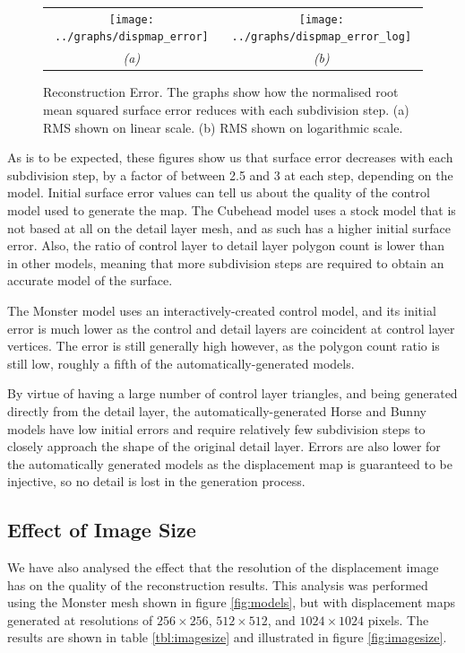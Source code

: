 \begin{figure}
\begin{center}
\begin{tabular}{cc} 
\texttt{[image: ../graphs/dispmap\_error]} & 
\texttt{[image: ../graphs/dispmap\_error\_log]} \\
{\it(a)} & {\it(b)}
\end{tabular}
\caption[Reconstruction Error]{\label{fig:reconerror} Reconstruction Error. The graphs show how the normalised root mean squared surface error reduces with each subdivision step. (a) RMS shown on linear scale. (b) RMS shown on logarithmic scale.}
\end{center}
\end{figure}

As is to be expected, these figures show us that surface error decreases with each subdivision step, by a factor of between 2.5 and 3 at each step, depending on the model. Initial surface error values can tell us about the quality of the control model used to generate the map. The Cubehead model uses a stock model that is not based at all on the detail layer mesh, and as such has a higher initial surface error. Also, the ratio of control layer to detail layer polygon count is lower than in other models, meaning that more subdivision steps are required to obtain an accurate model of the surface. 

The Monster model uses an interactively-created control model, and its initial error is much lower as the control and detail layers are coincident at control layer vertices. The error is still generally high however, as the polygon count ratio is still low, roughly a fifth of the automatically-generated models. 

By virtue of having a large number of control layer triangles, and being generated directly from the detail layer, the automatically-generated Horse and Bunny models have low initial errors and require relatively few subdivision steps to closely approach the shape of the original detail layer. Errors are also lower for the automatically generated models as the displacement map is guaranteed to be injective, so no detail is lost in the generation process.

\subsection{\label{sec:dispmapanim:reconstruction:results:imagesize}Effect of Image Size}

We have also analysed the effect that the resolution of the displacement image has on the quality of the reconstruction results. This analysis was performed using the Monster mesh shown in figure \ref{fig:models}, but with displacement maps generated at resolutions of $256\times256$, $512\times512$, and $1024\times1024$ pixels. The results are shown in table \ref{tbl:imagesize} and illustrated in figure \ref{fig:imagesize}.

